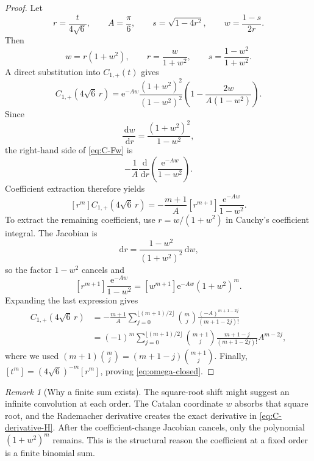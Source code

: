 \documentclass[11pt,a4paper]{article}
\numberwithin{equation}{section}
\theoremstyle{remark}
\newtheorem{remark}[theorem]{Remark}
\newcommand{\e}{\mathrm e}
\newcommand{\dd}{\,\mathrm d}
\begin{document}
\begin{proof}
Let
\begin{equation}
 r=\frac{t}{4\sqrt6},\qquad A=\frac{\pi}{6},\qquad
 s=\sqrt{1-4r^2},\qquad
 w=\frac{1-s}{2r}.
\end{equation}
Then
\begin{equation}\label{eq:Catalan-w}
 w=r(1+w^2),\qquad
 r=\frac{w}{1+w^2},\qquad
 s=\frac{1-w^2}{1+w^2}.
\end{equation}
A direct substitution into $C_{1,+}(t)$ gives
\begin{equation}\label{eq:C-Fw}
 C_{1,+}(4\sqrt6\,r)
 =\e^{-Aw}\frac{(1+w^2)^2}{(1-w^2)^2}
 \left(1-\frac{2w}{A(1-w^2)}\right).
\end{equation}
Since
\[
 \frac{\dd w}{\dd r}=\frac{(1+w^2)^2}{1-w^2},
\]
the right-hand side of \cref{eq:C-Fw} is
\begin{equation}\label{eq:C-derivative-H}
 -\frac1A\frac{\dd}{\dd r}
 \left(\frac{\e^{-Aw}}{1-w^2}\right).
\end{equation}
Coefficient extraction therefore yields
\begin{equation}\label{eq:omega-proof-step1}
 [r^m]C_{1,+}(4\sqrt6\,r)
 =-\frac{m+1}{A}[r^{m+1}]
 \frac{\e^{-Aw}}{1-w^2}.
\end{equation}
To extract the remaining coefficient, use $r=w/(1+w^2)$ in Cauchy's coefficient integral.  The Jacobian is
\[
 \dd r=\frac{1-w^2}{(1+w^2)^2}\dd w,
\]
so the factor $1-w^2$ cancels and
\begin{equation}\label{eq:omega-proof-residue}
 [r^{m+1}]\frac{\e^{-Aw}}{1-w^2}
 =[w^{m+1}]\e^{-Aw}(1+w^2)^m.
\end{equation}
Expanding the last expression gives
\begin{align*}
 [r^m]C_{1,+}(4\sqrt6\,r)
 &=-\frac{m+1}{A}
 \sum_{j=0}^{\lfloor(m+1)/2\rfloor}
 \binom{m}{j}
 \frac{(-A)^{m+1-2j}}{(m+1-2j)!}\\
 &=(-1)^m\sum_{j=0}^{\lfloor(m+1)/2\rfloor}
 \binom{m+1}{j}
 \frac{m+1-j}{(m+1-2j)!}A^{m-2j},
\end{align*}
where we used
$(m+1)\binom mj=(m+1-j)\binom{m+1}j$.
Finally,
$[t^m]=(4\sqrt6)^{-m}[r^m]$, proving \cref{eq:omega-closed}.
\end{proof}

\begin{remark}[Why a finite sum exists]
The square-root shift might suggest an infinite convolution at each order.  The Catalan coordinate $w$ absorbs that square root, and the Rademacher derivative creates the exact derivative in \cref{eq:C-derivative-H}.  After the coefficient-change Jacobian cancels, only the polynomial $(1+w^2)^m$ remains.  This is the structural reason the coefficient at a fixed order is a finite binomial sum.
\end{remark}
\end{document}
